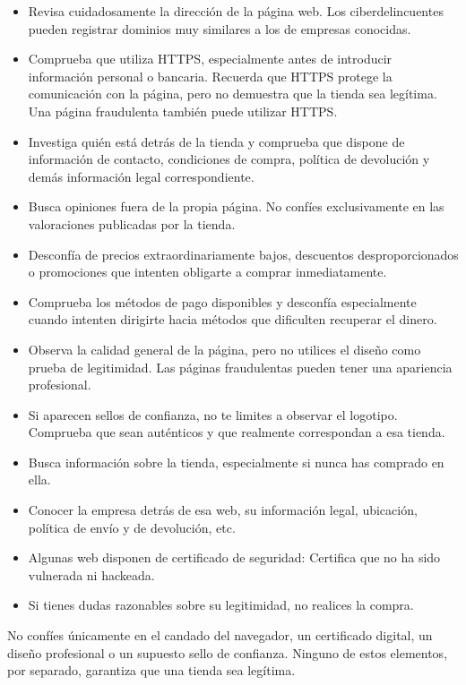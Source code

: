 \documentclass[
  spanish,
  a4paper,
  openany]{book}
\begin{document}
\begin{itemize}
\item
  Revisa cuidadosamente la dirección de la página web. Los ciberdelincuentes pueden registrar dominios muy similares a los de empresas conocidas.
\item
  Comprueba que utiliza HTTPS, especialmente antes de introducir información personal o bancaria. Recuerda que HTTPS protege la comunicación con la página, pero no demuestra que la tienda sea legítima. Una página fraudulenta también puede utilizar HTTPS.
\item
  Investiga quién está detrás de la tienda y comprueba que dispone de información de contacto, condiciones de compra, política de devolución y demás información legal correspondiente.
\item
  Busca opiniones fuera de la propia página. No confíes exclusivamente en las valoraciones publicadas por la tienda.
\item
  Desconfía de precios extraordinariamente bajos, descuentos desproporcionados o promociones que intenten obligarte a comprar inmediatamente.
\item
  Comprueba los métodos de pago disponibles y desconfía especialmente cuando intenten dirigirte hacia métodos que dificulten recuperar el dinero.
\item
  Observa la calidad general de la página, pero no utilices el diseño como prueba de legitimidad. Las páginas fraudulentas pueden tener una apariencia profesional.
\item
  Si aparecen sellos de confianza, no te limites a observar el logotipo. Comprueba que sean auténticos y que realmente correspondan a esa tienda.
\item
  Busca información sobre la tienda, especialmente si nunca has comprado en ella.
\item
  Conocer la empresa detrás de esa web, su información legal, ubicación, política de envío y de devolución, etc.
\item
  Algunas web disponen de certificado de seguridad: Certifica que no ha sido vulnerada ni hackeada.
\item
  Si tienes dudas razonables sobre su legitimidad, no realices la compra.
\end{itemize}

No confíes únicamente en el candado del navegador, un certificado digital, un diseño profesional o un supuesto sello de confianza. Ninguno de estos elementos, por separado, garantiza que una tienda sea legítima.
\end{document}
